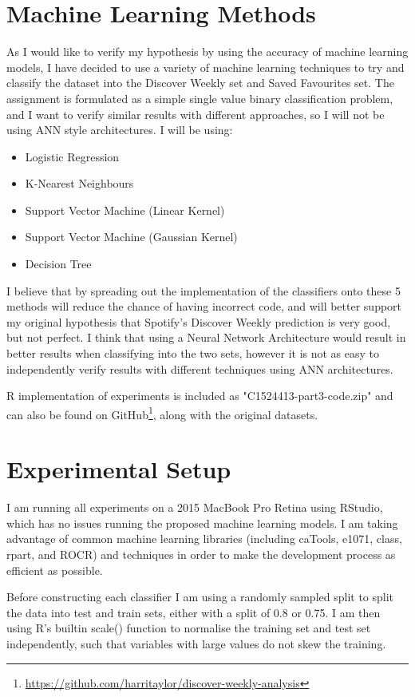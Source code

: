 \documentclass{article}
\begin{document}
    \section{Machine Learning Methods}
    	As I would like to verify my hypothesis by using the accuracy of machine learning models, I have decided to use a variety of machine learning techniques to try and classify the dataset into the Discover Weekly set and Saved Favourites set. The assignment is formulated as a simple single value binary classification problem, and I want to verify similar results with different approaches, so I will not be using ANN style architectures. I will be using:
		
		\begin{itemize}
			\item Logistic Regression
			\item K-Nearest Neighbours
			\item Support Vector Machine (Linear Kernel)
			\item Support Vector Machine (Gaussian Kernel)
			\item Decision Tree
		\end{itemize}
		
		I believe that by spreading out the implementation of the classifiers onto these 5 methods will reduce the chance of having incorrect code, and will better support my original hypothesis that Spotify's Discover Weekly prediction is very good, but not perfect. I think that using a Neural Network Architecture would result in better results when classifying into the two sets, however it is not as easy to independently verify results with different techniques using ANN architectures.
		
		R implementation of experiments is included as "C1524413-part3-code.zip" and can also be found on GitHub\footnote{\url{https://github.com/harritaylor/discover-weekly-analysis}}, along with the original datasets.
	
	\section{Experimental Setup}
		I am running all experiments on a 2015 MacBook Pro Retina using RStudio, which has no issues running the proposed machine learning models. I am taking advantage of common machine learning libraries (including caTools, e1071, class, rpart, and ROCR) and techniques in order to make the development process as efficient as possible.
		
		Before constructing each classifier I am using a randomly sampled split to split the data into test and train sets, either with a split of 0.8 or 0.75. I am then using R's builtin scale() function to normalise the training set and test set independently, such that variables with large values do not skew the training.
		
\end{document}
